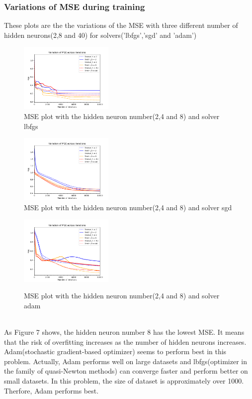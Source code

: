 \documentclass[a4paper]{article}
\begin{document}
\subsubsection{Variations of MSE during training}
These plots are the the variations of the MSE with three diﬀerent number of hidden neurons(2,8 and 40) for solvers('lbfgs','sgd' and 'adam')\\
\begin{figure}[h]
	\includegraphics[width=0.4\textwidth]{ex_1_1_d_lbfgs.png}\\
	\caption{MSE plot with the hidden neuron number(2,4 and 8) and solver lbfgs}
	\includegraphics[width=0.4\textwidth]{ex_1_1_d_sgd.png}\\
	\caption{MSE plot with the hidden neuron number(2,4 and 8) and solver sgd}
	\includegraphics[width=0.4\textwidth]{ex_1_1_d_adam.png}\\
	\caption{MSE plot with the hidden neuron number(2,4 and 8) and solver adam}
\end{figure}
\\
\noindent
As Figure 7 shows, the hidden neuron number 8 has the lowest MSE. It means that the risk of overfitting increases as the number of hidden neurons increases.\\
Adam(stochastic gradient-based optimizer) seems to perform best in this problem. Actually, Adam performs well on large datasets and lbfgs(optimizer in the family of quasi-Newton methods) can converge faster and perform better on small datasets. In this problem, the size of dataset is approximately over 1000. Therfore, Adam performs best.\\
\end{document}
